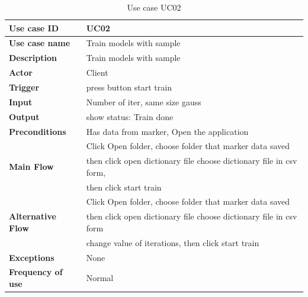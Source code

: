 \begin{table}[H]
  \begin{center}
    \begin{tabular}{ | l | l | } 
    \hline
    \textbf{Use case ID} & UC02 \\
    \hline
    \textbf{Use case name} & Train models with sample \\
    \hline
    \textbf{Description} & Train models with sample\\
    \hline
    \textbf{Actor} & Client \\
    \hline
    \textbf{Trigger} & press button start train\\
    \hline
    \textbf{Input} & Number of iter, same size gauss \\
    \hline
    \textbf{Output} & show status: Train done \\
    \hline    
    \textbf{Preconditions} & Has data from marker, Open the application \\
    \hline
    \multirow{3}{4em}{\textbf{Main Flow}}  & Click Open folder, choose folder that marker data saved\\
    & then click open dictionary file choose dictionary file in csv form,\\
    & then click start train \\
    \hline
    \multirow{3}{4em}{\textbf{Alternative Flow}} & Click Open folder, choose folder that marker data saved\\
    & then click open dictionary file choose dictionary file in csv form\\ 
    & change value of iterations, then click start train \\
    \hline
    \textbf{Exceptions} & None \\
    \hline
    \textbf{Frequency of use} & Normal \\
    \hline
    \end{tabular}
  \end{center}
  \caption{Use case UC02}\label{tab:uc2}
\end{table}


